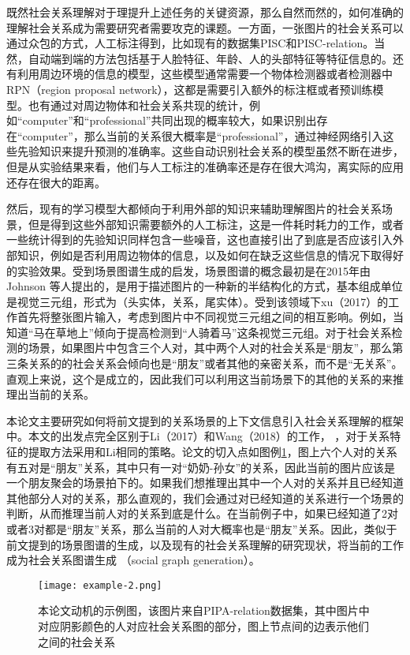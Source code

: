 既然社会关系理解对于理提升上述任务的关键资源，那么自然而然的，如何准确的理解社会关系成为需要研究者需要攻克的课题。一方面，一张图片的社会关系可以通过众包的方式，人工标注得到，比如现有的数据集PISC\cite{li2017dual-glance}和PISC-relation\cite{sun2017a}。当然，自动端到端的方法包括基于人脸特征、年龄、人的头部特征等特征信息的\cite{sun2017a,zhang2015learning}。还有利用周边环境的信息的模型\cite{li2017dual-glance,wang2018deep}，这些模型通常需要一个物体检测器或者检测器中RPN（region proposal network），这都是需要引入额外的标注框或者预训练模型。也有通过对周边物体和社会关系共现的统计，例如``computer''和``professional''共同出现的概率较大，如果识别出存在``computer''，那么当前的关系很大概率是``professional''，通过神经网络引入这些先验知识来提升预测的准确率。这些自动识别社会关系的模型虽然不断在进步，但是从实验结果来看，他们与人工标注的准确率还是存在很大鸿沟，离实际的应用还存在很大的距离。

然后，现有的学习模型大都倾向于利用外部的知识来辅助理解图片的社会关系场景，但是得到这些外部知识需要额外的人工标注，这是一件耗时耗力的工作，或者一些统计得到的先验知识同样包含一些噪音，这也直接引出了到底是否应该引入外部知识，例如是否利用周边物体的信息，以及如何在缺乏这些信息的情况下取得好的实验效果。受到场景图谱生成的启发，场景图谱的概念最初是在2015年由Johnson 等人\cite{johnson2015image}提出的，是用于描述图片的一种新的半结构化的方式，基本组成单位是视觉三元组，形式为（头实体，关系，尾实体）。受到该领域下xu（2017）\cite{xu2017scene}的工作首先将整张图片输入，考虑到图片中不同视觉三元组之间的相互影响。例如，当知道``马在草地上''倾向于提高检测到``人骑着马''这条视觉三元组。对于社会关系检测的场景，如果图片中包含三个人对，其中两个人对的社会关系是``朋友''，那么第三条关系的的社会关系会倾向也是``朋友''或者其他的亲密关系，而不是``无关系''。直观上来说，这个是成立的，因此我们可以利用这当前场景下的其他的关系的来推理出当前的关系。

本论文主要研究如何将前文提到的关系场景的上下文信息引入社会关系理解的框架中。本文的出发点完全区别于Li（2017）\cite{li2017dual-glance}和Wang（2018）\cite{wang2018deep}的工作，
，对于关系特征的提取方法采用和Li\cite{li2017dual-glance}相同的策略。论文的切入点如图例\ref{fig:intro-example-2}，图上六个人对的关系有五对是``朋友''关系，其中只有一对``奶奶-孙女''的关系，因此当前的图片应该是一个朋友聚会的场景拍下的。如果我们想推理出其中一个人对的关系并且已经知道其他部分人对的关系，那么直观的，我们会通过对已经知道的关系进行一个场景的判断，从而推理当前人对的关系到底是什么。在当前例子中，如果已经知道了2对或者3对都是``朋友''关系，那么当前的人对大概率也是``朋友''关系。因此，类似于前文提到的场景图谱的生成，以及现有的社会关系理解的研究现状，将当前的工作成为社会关系图谱生成
（social graph generation）。
\begin{figure}[htpb]
	\centering
	\texttt{[image: example-2.png]}
    \caption{本论文动机的示例图，该图片来自PIPA-relation数据集，其中图片中对应阴影颜色的人对应社会关系图的部分，图上节点间的边表示他们之间的社会关系}
	\vspace*{-3.5mm}
	\label{fig:intro-example-2}
\end{figure}

